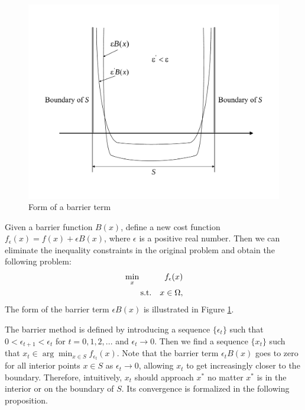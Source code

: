 \begin{figure}[ht]
\centering
\includegraphics[scale=0.4]{figures/lecture25-barrier_function}
\caption{Form of a barrier term}
\label{fig:barrier}
\end{figure}

Given a barrier function $B(x)$, define a new cost function
$f_\epsilon(x)=f(x)+\epsilon{B(x)}$, where $\epsilon$ is a positive real number.
Then we can eliminate the inequality constraints in the original problem and
obtain the following problem: 
%
\begin{equation}
\begin{aligned}
&\min_x & {f_\epsilon(x)}\\
&\qquad\text{s.t.} & x\in{\Omega},\\
\end{aligned}
\end{equation}
The form of the barrier term $\epsilon{B(x)}$ is illustrated in Figure \ref{fig:barrier}.

The barrier method is defined by introducing a sequence $\{\epsilon_t\}$ such
that $0<\epsilon_{t+1}<\epsilon_t$ for $t=0,1,2,...$ and
$\epsilon_t\rightarrow{0}$. Then we find a sequence $\{x_t\}$ such that
$x_t\in{\arg \min_{x\in{S}}}f_{\epsilon_t}(x)$. Note that the barrier term
$\epsilon_t{B(x)}$ goes to zero for all interior points $x\in{S}$ as
$\epsilon_t\rightarrow{0}$, allowing $x_t$ to get increasingly closer to the
boundary. Therefore, intuitively, $x_t$ should approach $x^*$ no matter $x^*$ is
in the interior or on the boundary of $S$. Its convergence is formalized in the
following proposition. 

